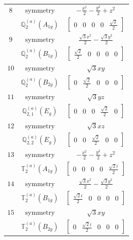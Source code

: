 \documentclass[fleqn,8pt,landscape]{jsarticle}
\begin{document}
\begin{longtable}{ccc}
$ 8 $ & $ \text{symmetry} $ & $ - \frac{x^{2}}{2} - \frac{y^{2}}{2} + z^{2} $ \\
$  $ & $ \mathbb{Q}_{2}^{(a)}(A_{1g}) $ & $ \begin{bmatrix} 0 & 0 & 0 & 0 & \frac{\sqrt{2}}{2} \end{bmatrix} $ \\ \hline
$ 9 $ & $ \text{symmetry} $ & $ \frac{\sqrt{3} x^{2}}{2} - \frac{\sqrt{3} y^{2}}{2} $ \\
$  $ & $ \mathbb{Q}_{2}^{(a)}(B_{1g}) $ & $ \begin{bmatrix} \frac{\sqrt{2}}{2} & 0 & 0 & 0 & 0 \end{bmatrix} $ \\ \hline
$ 10 $ & $ \text{symmetry} $ & $ \sqrt{3} x y $ \\
$  $ & $ \mathbb{Q}_{2}^{(a)}(B_{2g}) $ & $ \begin{bmatrix} 0 & \frac{\sqrt{2}}{2} & 0 & 0 & 0 \end{bmatrix} $ \\ \hline
$ 11 $ & $ \text{symmetry} $ & $ \sqrt{3} y z $ \\
$  $ & $ \mathbb{Q}_{2,1}^{(a)}(E_{g}) $ & $ \begin{bmatrix} 0 & 0 & 0 & \frac{\sqrt{2}}{2} & 0 \end{bmatrix} $ \\ \hline
$ 12 $ & $ \text{symmetry} $ & $ \sqrt{3} x z $ \\
$  $ & $ \mathbb{Q}_{2,2}^{(a)}(E_{g}) $ & $ \begin{bmatrix} 0 & 0 & \frac{\sqrt{2}}{2} & 0 & 0 \end{bmatrix} $ \\ \hline
$ 13 $ & $ \text{symmetry} $ & $ - \frac{x^{2}}{2} - \frac{y^{2}}{2} + z^{2} $ \\
$  $ & $ \mathbb{T}_{2}^{(a)}(A_{1g}) $ & $ \begin{bmatrix} 0 & 0 & 0 & 0 & \frac{\sqrt{2} i}{2} \end{bmatrix} $ \\ \hline
$ 14 $ & $ \text{symmetry} $ & $ \frac{\sqrt{3} x^{2}}{2} - \frac{\sqrt{3} y^{2}}{2} $ \\
$  $ & $ \mathbb{T}_{2}^{(a)}(B_{1g}) $ & $ \begin{bmatrix} \frac{\sqrt{2} i}{2} & 0 & 0 & 0 & 0 \end{bmatrix} $ \\ \hline
$ 15 $ & $ \text{symmetry} $ & $ \sqrt{3} x y $ \\
$  $ & $ \mathbb{T}_{2}^{(a)}(B_{2g}) $ & $ \begin{bmatrix} 0 & \frac{\sqrt{2} i}{2} & 0 & 0 & 0 \end{bmatrix} $ \\ \hline

\end{longtable}
\end{document}
